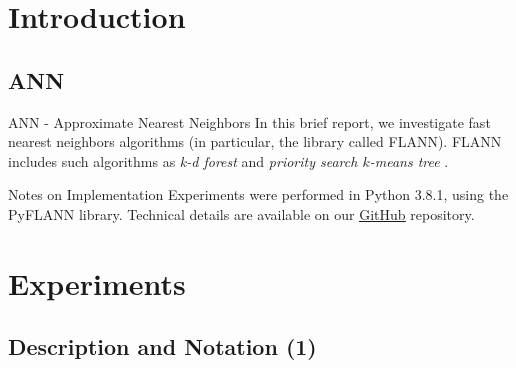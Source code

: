 \section{Introduction}
\subsection{ANN}

\begin{frame}
	
	\begin{block}{ANN - Approximate Nearest Neighbors}
		In this brief report, we investigate fast nearest neighbors algorithms (in particular, the library called FLANN). FLANN includes such algorithms as {\color{red} \textit{k-d forest}} and {\color{red} \textit{priority search $k$-means tree}} \cite{Muja2009}. 
	\end{block}
	
	\begin{block}{Notes on Implementation}
		Experiments were performed in Python 3.8.1, using the PyFLANN library. Technical details are available on our  \href{https://github.com/salisaresama/computer-vision/blob/master/flann.ipynb}{{\color{blue} \underline{GitHub}}} repository.
	\end{block}
	
\end{frame}


\section{Experiments}
\subsection{Description and Notation (1)}

